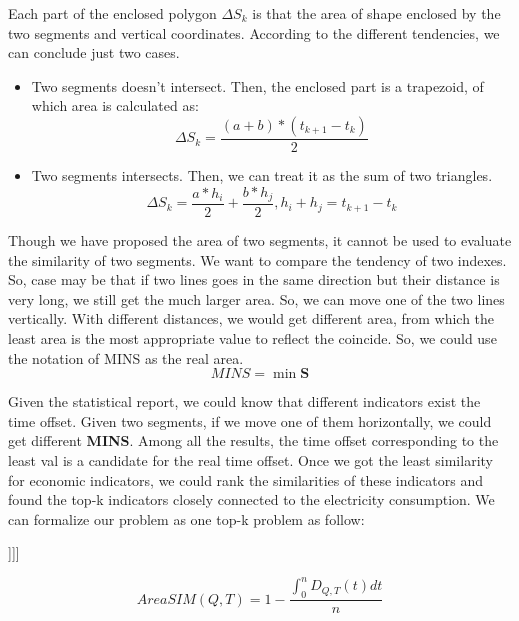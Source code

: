 \documentclass{sig-alternate-05-2015}
\begin{document}
Each part of the enclosed polygon \textit{$\Delta S_k$} is that the area of shape enclosed by the two segments and vertical coordinates. According to the different tendencies, we can conclude just two cases.
\begin{itemize}
	\item Two segments doesn't intersect. Then, the enclosed part is a trapezoid, of which area is calculated as:
\begin{equation}
	\Delta S_k = \frac{(a + b) * (t_{k+1} - t_k)}{2}
\end{equation}
	\item Two segments intersects. Then, we can treat it as the sum of two triangles.
\begin{equation}
	\Delta S_k = \frac{a * h_i}{2} + \frac{b * h_j}{2}, h_i + h_j = t_{k+1} - t_k 
\end{equation}
\end{itemize} 

Though we have proposed the area of two segments, it cannot be used to evaluate the similarity of two segments. We want to compare the tendency of two indexes. So, case may be that if two lines goes in the same direction but their distance is very long, we still get the much larger area. So, we can move one of the two lines vertically. With different distances, we would get different area, from which the least area is the most appropriate value to reflect the coincide. So, we could use the notation of MINS as the real area.
\begin{equation}
	MINS = \min{\textbf{S}}	
\end{equation}

Given the statistical report, we could know that different indicators exist the time offset. Given two segments, if we move one of them horizontally, we could get different \textbf{MINS}. Among all the results, the time offset corresponding to the least val is a candidate for the real time offset. Once we got the least similarity for economic indicators, we could rank the similarities of these indicators and found the top-k indicators closely connected to the electricity consumption. We can formalize our problem as one top-k problem as follow:
\begin{definition}
	[[[This part, we can put the top-K problem]]]]
\end{definition} 

\begin{equation}
AreaSIM(Q, T) = 1 - \frac{\int_{0}^{n}D_{Q,T}(t)dt}{n}	
\end{equation}
\end{document}
